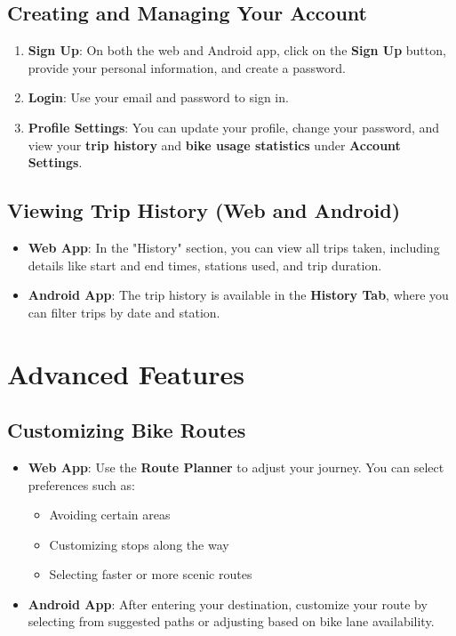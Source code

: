 \documentclass[12pt]{article}
\begin{document}
\subsection{Creating and Managing Your Account}
\begin{enumerate}
    \item \textbf{Sign Up}: On both the web and Android app, click on the \textbf{Sign Up} button, provide your personal information, and create a password.
    \item \textbf{Login}: Use your email and password to sign in.
    \item \textbf{Profile Settings}: You can update your profile, change your password, and view your \textbf{trip history} and \textbf{bike usage statistics} under \textbf{Account Settings}.
\end{enumerate}

\subsection{Viewing Trip History (Web and Android)}
\begin{itemize}
    \item \textbf{Web App}: In the "History" section, you can view all trips taken, including details like start and end times, stations used, and trip duration.
    \item \textbf{Android App}: The trip history is available in the \textbf{History Tab}, where you can filter trips by date and station.
\end{itemize}

\section{Advanced Features}

\subsection{Customizing Bike Routes}
\begin{itemize}
    \item \textbf{Web App}: Use the \textbf{Route Planner} to adjust your journey. You can select preferences such as:
    \begin{itemize}
        \item Avoiding certain areas
        \item Customizing stops along the way
        \item Selecting faster or more scenic routes
    \end{itemize}
    \item \textbf{Android App}: After entering your destination, customize your route by selecting from suggested paths or adjusting based on bike lane availability.
\end{itemize}
\end{document}
